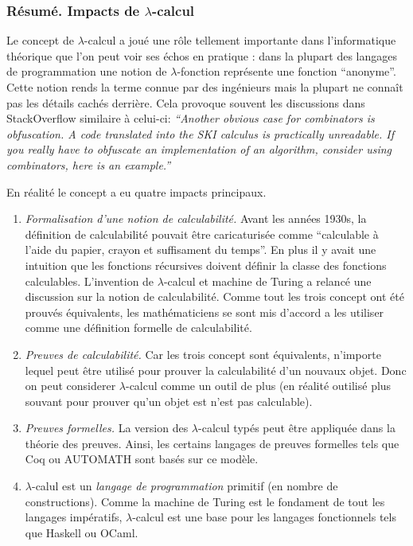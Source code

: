 \documentclass[12pt, a4paper]{article}
\begin{document}
\subsubsection*{Résumé. Impacts de $\lambda$-calcul}
Le concept de $\lambda$-calcul a joué une rôle tellement importante dans l'informatique théorique que l'on peut voir ses échos en pratique : dans la plupart des langages de programmation une notion de $\lambda$-fonction représente une fonction ``anonyme''.
Cette notion rends la terme connue par des ingénieurs mais la plupart ne connaît pas les détails cachés derrière.
Cela provoque souvent les discussions dans StackOverflow similaire à celui-ci:
\textit{``Another obvious case for combinators is obfuscation. A code translated into the SKI calculus is practically unreadable. If you really have to obfuscate an implementation of an algorithm, consider using combinators, here is an example.''}

En réalité le concept a eu quatre impacts principaux.
\begin{enumerate}
	\item \emph{Formalisation d'une notion de calculabilité.} Avant les années 1930s, la définition de calculabilité pouvait être caricaturisée comme ``calculable à l'aide du papier, crayon et suffisament du temps''. En plus il y avait une intuition que les fonctions récursives doivent définir la classe des fonctions calculables.
	L'invention de $\lambda$-calcul et machine de Turing a relancé une discussion sur la notion de calculabilité. Comme tout les trois concept ont été prouvés équivalents, les mathématiciens se sont mis d'accord a les utiliser comme une définition formelle de calculabilité.
	\item \emph{Preuves de calculabilité.} Car les trois concept sont équivalents, n'importe lequel peut être utilisé pour prouver la calculabilité d'un nouvaux objet. Donc on peut considerer $\lambda$-calcul comme un outil de plus (en réalité outilisé plus souvant pour prouver qu'un objet est n'est pas calculable).
	\item \emph{Preuves formelles.}
	La version des $\lambda$-calcul typés peut être appliquée dans la théorie des preuves. Ainsi, les certains langages de preuves formelles tels que Coq ou AUTOMATH sont basés sur ce modèle.
	
	\item $\lambda$-calul est un \emph{langage de programmation} primitif (en nombre de constructions). Comme la machine de Turing est le fondament de tout les langages impératifs, $\lambda$-calcul est une base pour les langages fonctionnels tels que Haskell ou OCaml.
\end{enumerate}
\end{document}
